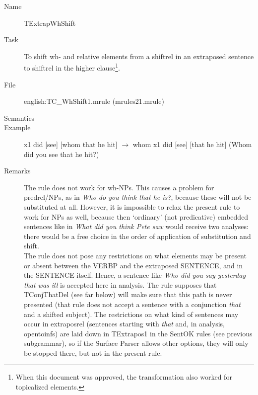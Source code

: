 \begin{description}
\vspace{1 cm}
\begin{description}
\item[Name] TExtrapWhShift
\item[Task] To shift wh- and relative elements from a shiftrel in an extraposed 
sentence to shiftrel in the higher clause\footnote{When this document was 
approved, the transformation also worked for topicalized elements.}.
\item[File] english:TC\_WhShift1.mrule (mrules21.mrule)
\item[Semantics]
\item[Example] x1 did [see] [whom that he hit] $\rightarrow$ whom x1 did 
[see] [that he hit] (Whom did you see that he hit?)
\item[Remarks] The rule does not work for wh-NPs. This causes a problem 
for predrel/NPs, as in {\em Who do you think that
he is?\/}, because these will not be substituted at all. However, it is 
impossible to relax the present rule to work for NPs as well, because 
then `ordinary' (not predicative) embedded sentences like in {\em What 
did you think Pete saw\/} would receive two analyses: 
there would be a free choice in the order of application of substitution 
and shift.\\
The rule does not pose any restrictions on what elements may be present or
absent between the VERBP and the extraposed SENTENCE, and in the SENTENCE
itself. Hence, a sentence like {\em Who did you say yesterday that was ill\/}
is accepted here in analysis. The rule supposes that TConjThatDel (see far
below) will make sure that this path is never presented (that rule does not
accept a sentence with a conjunction {\em that\/} and a shifted subject). 
The restrictions on what kind of sentences may occur in extraposrel (sentences 
starting with {\em that\/} and, in analysis, opentoinfs) are laid down in 
TExtrapos1 in the SentOK rules (see previous subgrammar), so if the Surface 
Parser allows other options, they will only be stopped there, but not in the 
present rule.
\end{description}


\end{description}

